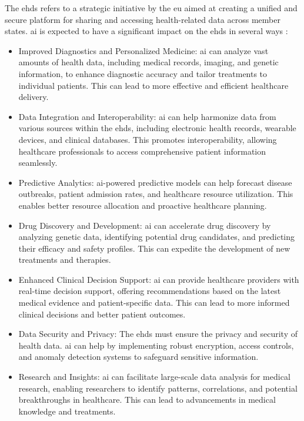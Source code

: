 The \ac{ehds} refers to a strategic initiative by the \ac{eu} aimed at creating a unified and secure platform for sharing and accessing health-related data across member states. \ac{ai} is expected to have a significant impact on the \ac{ehds} in several ways \cite{ehds}:

\begin{itemize}
    \item Improved Diagnostics and Personalized Medicine: \ac{ai} can analyze vast amounts of health data, including medical records, imaging, and genetic information, to enhance diagnostic accuracy and tailor treatments to individual patients. This can lead to more effective and efficient healthcare delivery.
\item Data Integration and Interoperability: \ac{ai} can help harmonize data from various sources within the \ac{ehds}, including electronic health records, wearable devices, and clinical databases. This promotes interoperability, allowing healthcare professionals to access comprehensive patient information seamlessly.

\item Predictive Analytics: \ac{ai}-powered predictive models can help forecast disease outbreaks, patient admission rates, and healthcare resource utilization. This enables better resource allocation and proactive healthcare planning.

\item Drug Discovery and Development: \ac{ai} can accelerate drug discovery by analyzing genetic data, identifying potential drug candidates, and predicting their efficacy and safety profiles. This can expedite the development of new treatments and therapies.

\item Enhanced Clinical Decision Support: \ac{ai} can provide healthcare providers with real-time decision support, offering recommendations based on the latest medical evidence and patient-specific data. This can lead to more informed clinical decisions and better patient outcomes.

\item Data Security and Privacy: The \ac{ehds} must ensure the privacy and security of health data. \ac{ai} can help by implementing robust encryption, access controls, and anomaly detection systems to safeguard sensitive information.

\item Research and Insights: \ac{ai} can facilitate large-scale data analysis for medical research, enabling researchers to identify patterns, correlations, and potential breakthroughs in healthcare. This can lead to advancements in medical knowledge and treatments.


\end{itemize}
